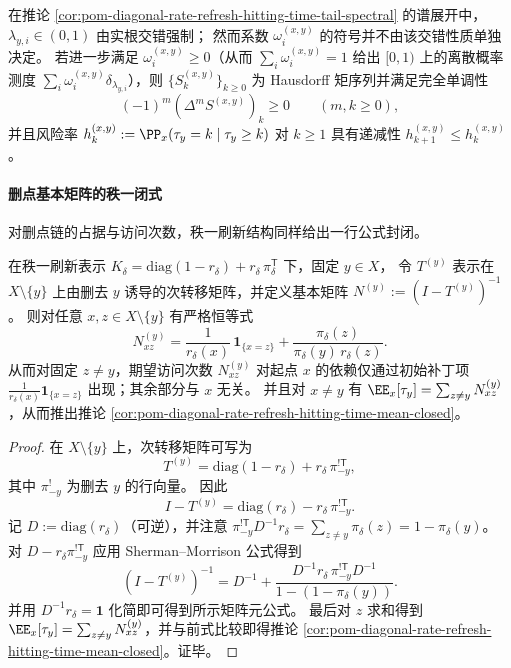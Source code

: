 \begin{remark}[系数正性与完全单调尾]\label{rem:pom-diagonal-rate-refresh-hitting-time-tail-hausdorff-condition}
在推论 \ref{cor:pom-diagonal-rate-refresh-hitting-time-tail-spectral} 的谱展开中，\(\lambda_{y,i}\in(0,1)\) 由实根交错强制；
然而系数 \(\omega_i^{(x,y)}\) 的符号并不由该交错性质单独决定。
若进一步满足 \(\omega_i^{(x,y)}\ge 0\)（从而 \(\sum_i\omega_i^{(x,y)}=1\) 给出 \([0,1)\) 上的离散概率测度 \(\sum_i\omega_i^{(x,y)}\delta_{\lambda_{y,i}}\)），则 \(\{S_k^{(x,y)}\}_{k\ge 0}\) 为 Hausdorff 矩序列并满足完全单调性
\[
(-1)^m(\Delta^m S^{(x,y)})_k\ge 0\qquad(m,k\ge 0),
\]
并且风险率 \(h_k^{(x,y)}:=\PP_x(\tau_y=k\mid \tau_y\ge k)\) 对 \(k\ge 1\) 具有递减性 \(h_{k+1}^{(x,y)}\le h_k^{(x,y)}\)。
\end{remark}

\paragraph{删点基本矩阵的秩一闭式}
对删点链的占据与访问次数，秩一刷新结构同样给出一行公式封闭。

\begin{theorem}[删点基本矩阵秩一闭式]\label{thm:pom-diagonal-rate-refresh-fundamental-matrix-rankone}
在秩一刷新表示 \(K_\delta=\mathrm{diag}(1-r_\delta)+r_\delta\,\pi_\delta^{\mathsf T}\) 下，固定 \(y\in X\)，
令 \(T^{(y)}\) 表示在 \(X\setminus\{y\}\) 上由删去 \(y\) 诱导的次转移矩阵，并定义基本矩阵 \(N^{(y)}:=(I-T^{(y)})^{-1}\)。
则对任意 \(x,z\in X\setminus\{y\}\) 有严格恒等式
\[
N^{(y)}_{xz}=\frac{1}{r_\delta(x)}\,\mathbf 1_{\{x=z\}}+\frac{\pi_\delta(z)}{\pi_\delta(y)\,r_\delta(z)}.
\]
从而对固定 \(z\ne y\)，期望访问次数 \(N^{(y)}_{xz}\) 对起点 \(x\) 的依赖仅通过初始补丁项 \(\frac{1}{r_\delta(x)}\mathbf 1_{\{x=z\}}\) 出现；其余部分与 \(x\) 无关。
并且对 \(x\ne y\) 有
\(
\EE_x[\tau_y]=\sum_{z\ne y}N^{(y)}_{xz}
\)，从而推出推论 \ref{cor:pom-diagonal-rate-refresh-hitting-time-mean-closed}。
\end{theorem}
\begin{proof}
在 \(X\setminus\{y\}\) 上，次转移矩阵可写为
\[
T^{(y)}=\mathrm{diag}(1-r_\delta)+r_\delta\,\pi_{-y}^{!\mathsf T},
\]
其中 \(\pi_{-y}^{!}\) 为删去 \(y\) 的行向量。
因此
\[
I-T^{(y)}=\mathrm{diag}(r_\delta)-r_\delta\,\pi_{-y}^{!\mathsf T}.
\]
记 \(D:=\mathrm{diag}(r_\delta)\)（可逆），并注意 \(\pi_{-y}^{!\mathsf T}D^{-1}r_\delta=\sum_{z\ne y}\pi_\delta(z)=1-\pi_\delta(y)\)。
对 \(D-r_\delta\pi_{-y}^{!\mathsf T}\) 应用 Sherman--Morrison 公式得到
\[
(I-T^{(y)})^{-1}
=D^{-1}+\frac{D^{-1}r_\delta\,\pi_{-y}^{!\mathsf T}D^{-1}}{1-(1-\pi_\delta(y))}.
\]
并用 \(D^{-1}r_\delta=\mathbf 1\) 化简即可得到所示矩阵元公式。
最后对 \(z\) 求和得到 \(\EE_x[\tau_y]=\sum_{z\ne y}N^{(y)}_{xz}\)，并与前式比较即得推论 \ref{cor:pom-diagonal-rate-refresh-hitting-time-mean-closed}。证毕。
\end{proof}

